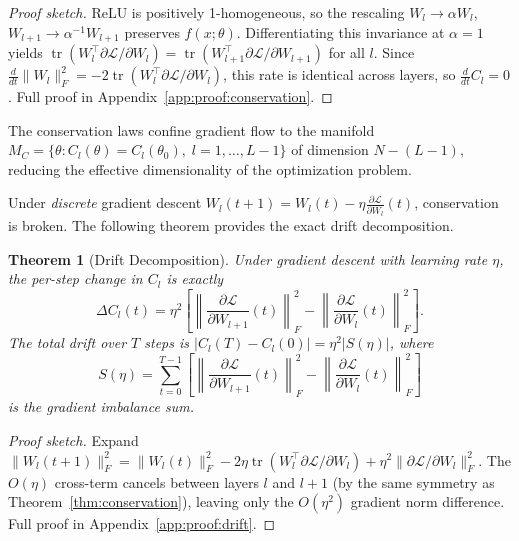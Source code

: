 \documentclass[11pt]{article}
\newcommand{\lr}{\eta}                    %
\newcommand{\conslaw}{C_l}                %
\newcommand{\imbal}{S}                    %
\newcommand{\nsteps}{T}                   %
\newcommand{\frobnorm}[1]{\|#1\|_F}      %
\newcommand{\tr}{\operatorname{tr}}       %
\newtheorem{theorem}{Theorem}
\theoremstyle{definition}
\theoremstyle{remark}
\begin{document}
\begin{proof}[Proof sketch]
ReLU is positively 1-homogeneous, so the rescaling $W_l \to \alpha W_l$, $W_{l+1} \to \alpha^{-1} W_{l+1}$ preserves $f(x; \theta)$. Differentiating this invariance at $\alpha = 1$ yields $\tr(W_l^\top \partial\mathcal{L}/\partial W_l) = \tr(W_{l+1}^\top \partial\mathcal{L}/\partial W_{l+1})$ for all $l$. Since $\frac{d}{dt}\frobnorm{W_l}^2 = -2\tr(W_l^\top \partial\mathcal{L}/\partial W_l)$, this rate is identical across layers, so $\frac{d}{dt}\conslaw = 0$. Full proof in Appendix~\ref{app:proof:conservation}.
\end{proof}

The conservation laws confine gradient flow to the manifold $M_C = \{\theta : \conslaw(\theta) = \conslaw(\theta_0),\; l = 1,\ldots,L-1\}$ of dimension $N - (L{-}1)$, reducing the effective dimensionality of the optimization problem.

Under \emph{discrete} gradient descent $W_l(t+1) = W_l(t) - \lr \frac{\partial\mathcal{L}}{\partial W_l}(t)$, conservation is broken. The following theorem provides the exact drift decomposition.

\begin{theorem}[Drift Decomposition]\label{thm:drift}
Under gradient descent with learning rate $\lr$, the per-step change in $\conslaw$ is exactly
\begin{equation}\label{eq:drift}
    \Delta \conslaw(t) = \lr^2 \left[\left\|\frac{\partial\mathcal{L}}{\partial W_{l+1}}(t)\right\|_F^2 - \left\|\frac{\partial\mathcal{L}}{\partial W_l}(t)\right\|_F^2\right].
\end{equation}
The total drift over $\nsteps$ steps is $|\conslaw(\nsteps) - \conslaw(0)| = \lr^2 |\imbal(\lr)|$, where
\begin{equation}\label{eq:imbalance}
    \imbal(\lr) = \sum_{t=0}^{\nsteps-1} \left[\left\|\frac{\partial\mathcal{L}}{\partial W_{l+1}}(t)\right\|_F^2 - \left\|\frac{\partial\mathcal{L}}{\partial W_l}(t)\right\|_F^2\right]
\end{equation}
is the \emph{gradient imbalance sum}.
\end{theorem}

\begin{proof}[Proof sketch]
Expand $\frobnorm{W_l(t+1)}^2 = \frobnorm{W_l(t)}^2 - 2\lr\tr(W_l^\top \partial\mathcal{L}/\partial W_l) + \lr^2 \|\partial\mathcal{L}/\partial W_l\|_F^2$. The $O(\lr)$ cross-term cancels between layers $l$ and $l+1$ (by the same symmetry as Theorem~\ref{thm:conservation}), leaving only the $O(\lr^2)$ gradient norm difference. Full proof in Appendix~\ref{app:proof:drift}.
\end{proof}
\end{document}
